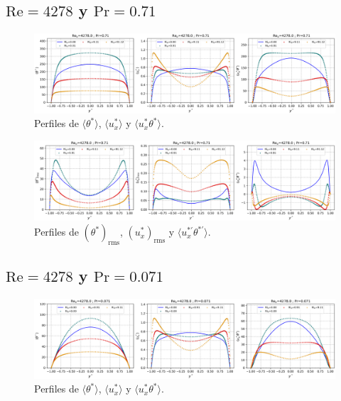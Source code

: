 
\subsection*{$\text{Re}=4278$ y $\text{Pr}=0\text{.}71$}

\begin{figure}[H]
  \centering
    \includegraphics[width=\textwidth]{figures/apendices/developed/Re4278-Pr071_merged_phi-ux-uxphi.png}
  \caption{Perfiles de  $\langle \theta^* \rangle$,  $\langle u^*_x \rangle$ y   $\langle u^*_x \theta^* \rangle$.}
  \label{fig:profs-Re4278-Pr071}
\end{figure}

\begin{figure}[H]
  \centering
    \includegraphics[width=\textwidth]{figures/apendices/developed/Re4278-Pr071_merged_phif-uxf-uxphif.png}
  \caption{Perfiles de  $( \theta^*)_{\text{rms}}$,  $(u^*_x)_{\text{rms}}$ y   $\langle u^{* \prime}_x \theta^{* \prime} \rangle$.}
  \label{fig:profs-Re4278-Pr071}
\end{figure}

\subsection*{$\text{Re}=4278$ y $\text{Pr}=0\text{.}071$}

\begin{figure}[H]
  \centering
    \includegraphics[width=\textwidth]{figures/apendices/developed/Re4278-Pr0071_merged_phi-ux-uxphi.png}
  \caption{Perfiles de  $\langle \theta^* \rangle$,  $\langle u^*_x \rangle$ y  $\langle u^*_x \theta^* \rangle$.}
  \label{fig:profs-Re4278-Pr0071}
\end{figure}

